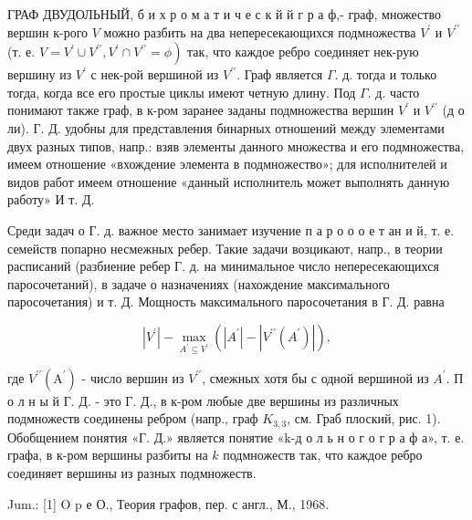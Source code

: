 \documentclass[10pt]{article}
\begin{document}
ГРАФ ДВУДОЛЬНЫЙ, б и х р о м а т и ч е с к й й г р а ф,- граф, множество вершин к-рого $V$ можно разбить на два непересекающихся подмножества $V^{\prime}$ и $V^{\prime \prime}$ (т. е. $\left.V=V^{\prime} \cup V^{\prime \prime}, V^{\prime} \cap V^{\prime \prime}=\phi\right)$ так, что каждое ребро соединяет нек-рую вершину из $V^{\prime}$ с нек-рой вершиной из $V^{\prime \prime}$. Граф является $\Gamma$. д. тогда и только тогда, когда все его простые циклы имеют четную длину. Под $\Gamma$. д. часто понимают также граф, в к-ром заранее заданы подмножества вершин $V^{\prime}$ и $V^{\prime \prime}$ (д о ли). Г. Д. удобны для представления бинарных отношений между элементами двух разных типов, напр.: взяв элементы данного множества и его подмножества, имеем отношение «вхождение элемента в подмножество»; для исполнителей и видов работ имеем отношение «данный исполнитель может выполнять данную работу» И т. Д.



Среди задач о Г. д. важное место занимает изучение п а р о о о е т ан и й, т. е. семейств попарно несмежных ребер. Такие задачи возцикают, напр., в теории расписаний (разбиение ребер Г. д. на минимальное число непересекающихся паросочетаний), в задаче о назначениях (нахождение максимального паросочетания) и т. Д. Мощность максимального паросочетания в $Г$. Д. равна



\[

\left|V^{\prime}\right|-\max _{A^{\prime} \subseteq V^{\prime}}\left(\left|A^{\prime}\right|-\left|V^{\prime \prime}\left(A^{\prime}\right)\right|\right),

\]



где $V^{\prime \prime}\left(\mathrm{A}^{\prime}\right)$ - число вершин из $V^{\prime \prime}$, смежных хотя бы с одной вершиной из $A^{\prime}$. П о л н ы й $Г$. Д. - это Г. Д., в к-ром любые две вершины из различных подмножеств соединены ребром (напр., граф $K_{3,3}$, см. Граб плоский, рис. 1). Обобщением понятия «Г. Д.» является понятие «k-д о л ь н о г о г р а ф а», т. е. графа, в к-ром вершины разбиты на $k$ подмножеств так, что каждое ребро соединяет вершины из разных подмножеств.



Jum.: [1] O p е О., Теория графов, пер. с англ., М., 1968.
\end{document}

